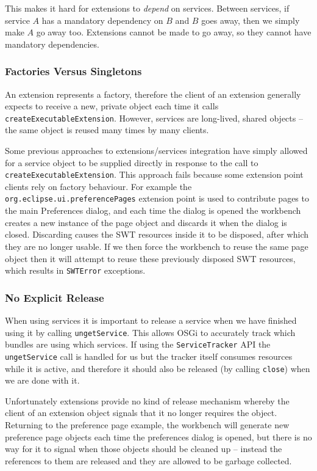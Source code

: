 \documentclass[12pt]{article}
\begin{document}
This makes it hard for extensions to \emph{depend} on services. Between services, if service $A$ has a mandatory dependency on $B$ and $B$ goes away, then we simply make $A$ go away too. Extensions cannot be made to go away, so they cannot have mandatory dependencies.

\subsubsection{Factories Versus Singletons}

An extension represents a factory, therefore the client of an extension generally expects to receive a new, private object each time it calls \texttt{create\-Exec\-utable\-Ext\-en\-sion}. However, services are long-lived, shared objects -- the same object is reused many times by many clients.

Some previous approaches to extensions/services integration have simply allowed for a service object to be supplied directly in response to the call to \texttt{create\-Exec\-utable\-Ext\-en\-sion}. This approach fails because some extension point clients rely on factory behaviour. For example the \texttt{org.eclipse.ui.preferencePages} extension point is used to contribute pages to the main Preferences dialog, and each time the dialog is opened the workbench creates a new instance of the page object and discards it when the dialog is closed. Discarding causes the SWT resources inside it to be disposed, after which they are no longer usable. If we then force the workbench to reuse the same page object then it will attempt to reuse these previously disposed SWT resources, which results in \texttt{SWTError} exceptions. 

\subsubsection{No Explicit Release}

When using services it is important to release a service when we have finished using it by calling \texttt{ungetService}. This allows OSGi to accurately track which bundles are using which services. If using the \texttt{ServiceTracker} API the \texttt{ungetService} call is handled for us but the tracker itself consumes resources while it is active, and therefore it should also be released (by calling \texttt{close}) when we are done with it.

Unfortunately extensions provide no kind of release mechanism whereby the client of an extension object signals that it no longer requires the object. Returning to the preference page example, the workbench will generate new preference page objects each time the preferences dialog is opened, but there is no way for it to signal when those objects should be cleaned up -- instead the references to them are released and they are allowed to be garbage collected.
\end{document}
